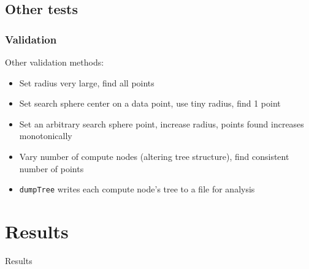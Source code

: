 \documentclass[usernames,dvipsnames]{beamer}
\begin{document}
\subsection{Other tests}

\begin{frame}	
	\frametitle{Validation}
	
	\begin{block}{Other validation methods:}
		\begin{itemize}
			\item Set radius very large, find all points
			\item Set search sphere center on a data point, use tiny radius, find 1 point
			\item Set an arbitrary search sphere point, increase radius, points found increases monotonically
			\item Vary number of compute nodes (altering tree structure), find consistent number of points
			\item \texttt{dumpTree} writes each compute node's tree to a file for analysis
		\end{itemize}
	\end{block}
	
\end{frame}




\section{Results}

\begin{frame}	
	\begin{Huge}
		\begin{center}
			Results
		\end{center}
	\end{Huge}
\end{frame}

\end{document}
